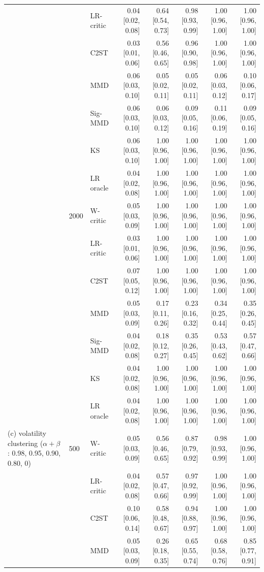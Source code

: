 \begin{tabular}{lllrrrrr}
 &  & LR-critic & 0.04 [0.02, 0.08] & 0.64 [0.54, 0.73] & 0.98 [0.93, 0.99] & 1.00 [0.96, 1.00] & 1.00 [0.96, 1.00] \\
 &  & C2ST & 0.03 [0.01, 0.06] & 0.56 [0.46, 0.65] & 0.96 [0.90, 0.98] & 1.00 [0.96, 1.00] & 1.00 [0.96, 1.00] \\
 &  & MMD & 0.06 [0.03, 0.10] & 0.05 [0.02, 0.11] & 0.05 [0.02, 0.11] & 0.06 [0.03, 0.12] & 0.10 [0.06, 0.17] \\
 &  & Sig-MMD & 0.06 [0.03, 0.10] & 0.06 [0.03, 0.12] & 0.09 [0.05, 0.16] & 0.11 [0.06, 0.19] & 0.09 [0.05, 0.16] \\
 &  & KS & 0.06 [0.03, 0.10] & 1.00 [0.96, 1.00] & 1.00 [0.96, 1.00] & 1.00 [0.96, 1.00] & 1.00 [0.96, 1.00] \\
 &  & LR oracle & 0.04 [0.02, 0.08] & 1.00 [0.96, 1.00] & 1.00 [0.96, 1.00] & 1.00 [0.96, 1.00] & 1.00 [0.96, 1.00] \\
 & 2000 & W-critic & 0.05 [0.03, 0.09] & 1.00 [0.96, 1.00] & 1.00 [0.96, 1.00] & 1.00 [0.96, 1.00] & 1.00 [0.96, 1.00] \\
 &  & LR-critic & 0.03 [0.01, 0.06] & 1.00 [0.96, 1.00] & 1.00 [0.96, 1.00] & 1.00 [0.96, 1.00] & 1.00 [0.96, 1.00] \\
 &  & C2ST & 0.07 [0.05, 0.12] & 1.00 [0.96, 1.00] & 1.00 [0.96, 1.00] & 1.00 [0.96, 1.00] & 1.00 [0.96, 1.00] \\
 &  & MMD & 0.05 [0.03, 0.09] & 0.17 [0.11, 0.26] & 0.23 [0.16, 0.32] & 0.34 [0.25, 0.44] & 0.35 [0.26, 0.45] \\
 &  & Sig-MMD & 0.04 [0.02, 0.08] & 0.18 [0.12, 0.27] & 0.35 [0.26, 0.45] & 0.53 [0.43, 0.62] & 0.57 [0.47, 0.66] \\
 &  & KS & 0.04 [0.02, 0.08] & 1.00 [0.96, 1.00] & 1.00 [0.96, 1.00] & 1.00 [0.96, 1.00] & 1.00 [0.96, 1.00] \\
 &  & LR oracle & 0.04 [0.02, 0.08] & 1.00 [0.96, 1.00] & 1.00 [0.96, 1.00] & 1.00 [0.96, 1.00] & 1.00 [0.96, 1.00] \\
(c) volatility clustering ($\alpha+\beta$: 0.98, 0.95, 0.90, 0.80, 0) & 500 & W-critic & 0.05 [0.03, 0.09] & 0.56 [0.46, 0.65] & 0.87 [0.79, 0.92] & 0.98 [0.93, 0.99] & 1.00 [0.96, 1.00] \\
 &  & LR-critic & 0.04 [0.02, 0.08] & 0.57 [0.47, 0.66] & 0.97 [0.92, 0.99] & 1.00 [0.96, 1.00] & 1.00 [0.96, 1.00] \\
 &  & C2ST & 0.10 [0.06, 0.14] & 0.58 [0.48, 0.67] & 0.94 [0.88, 0.97] & 1.00 [0.96, 1.00] & 1.00 [0.96, 1.00] \\
 &  & MMD & 0.05 [0.03, 0.09] & 0.26 [0.18, 0.35] & 0.65 [0.55, 0.74] & 0.68 [0.58, 0.76] & 0.85 [0.77, 0.91] \\

\end{tabular}
